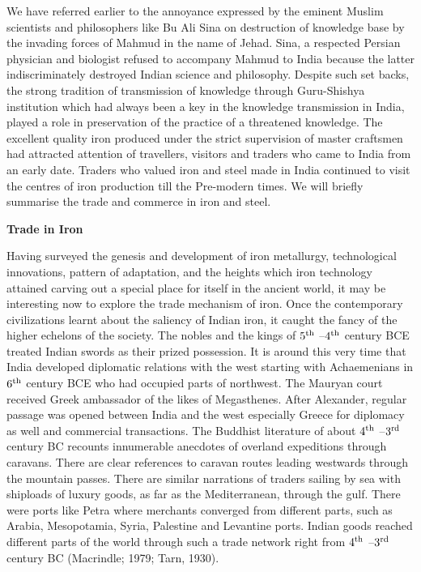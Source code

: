 We have referred earlier to the annoyance expressed by the eminent Muslim scientists and philosophers like Bu Ali Sina on destruction of knowledge base by the invading forces of Mahmud in the name of Jehad. Sina, a respected Persian physician and biologist refused to accompany Mahmud to India because the latter indiscriminately destroyed Indian science and philosophy. Despite such set backs, the strong tradition of transmission of knowledge through Guru-Shishya institution which had always been a key in the knowledge transmission in India, played a role in preservation of the practice of a threatened knowledge. The excellent quality iron produced under the strict supervision of master craftsmen had attracted attention of travellers, visitors and traders who came to India from an early date.  Traders who valued iron and steel made in India continued to visit the centres of iron production till the Pre-modern times. We will briefly summarise the trade and commerce in iron and steel.

\noindent \textbf{\large Trade in Iron}

Having surveyed the genesis and development of iron metallurgy, technological innovations, pattern of adaptation, and the heights which iron technology attained carving out a special place for itself in the ancient world, it may be interesting now to explore the trade mechanism of iron. Once the contemporary civilizations learnt about the saliency of Indian iron, it caught the fancy of the higher echelons of the society. The nobles and the kings of $5^{\rm th}$ –$4^{\rm th}$ century BCE treated Indian swords as their prized possession. It is around this very time that India developed diplomatic relations with the west starting with Achaemenians in $6^{\rm th}$ century BCE who had occupied parts of northwest. The Mauryan court received Greek ambassador of the likes of Megasthenes. After Alexander, regular passage was opened between India and the west especially Greece for diplomacy as well and commercial transactions. The Buddhist literature of about $4^{\rm th}$ –$3^{\rm rd}$ century BC recounts innumerable anecdotes of overland expeditions through caravans. There are clear references to caravan routes leading westwards through the mountain passes. There are similar narrations of traders sailing by sea with shiploads of luxury goods, as far as the Mediterranean, through the gulf. There were ports like Petra where merchants converged from different parts, such as Arabia, Mesopotamia, Syria, Palestine and Levantine ports. Indian goods reached different parts of the world through such a trade network right from $4^{\rm th}$ –$3^{\rm rd}$ century BC (Macrindle; 1979; Tarn, 1930).

